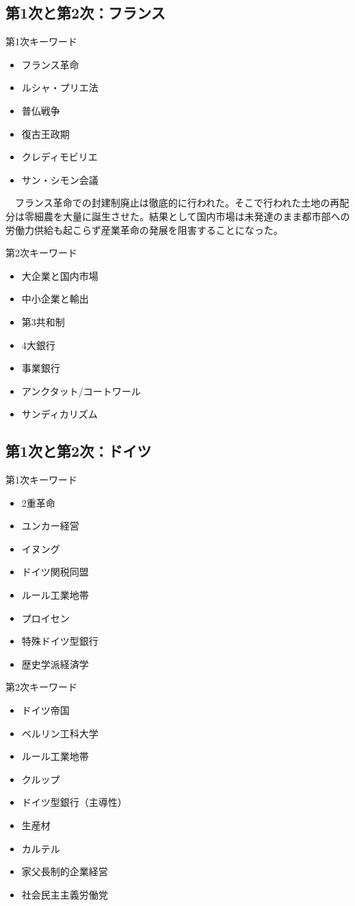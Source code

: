 \documentclass{jsarticle}
\begin{document}
\subsection{第1次と第2次：フランス}
第1次キーワード
\begin{itemize}
\item フランス革命
\item ルシャ・プリエ法
\item 普仏戦争
\item 復古王政期
\item クレディモビリエ
\item サン・シモン会議
\end{itemize}
　フランス革命での封建制廃止は徹底的に行われた。そこで行われた土地の再配分は零細農を大量に誕生させた。結果として国内市場は未発達のまま都市部への労働力供給も起こらず産業革命の発展を阻害することになった。

第2次キーワード
\begin{itemize}
\item 大企業と国内市場
\item 中小企業と輸出
\item 第3共和制
\item 4大銀行
\item 事業銀行
\item アンクタット/コートワール
\item サンディカリズム
\end{itemize}

\subsection{第1次と第2次：ドイツ}
第1次キーワード
\begin{itemize}
\item 2重革命
\item ユンカー経営
\item イヌング
\item ドイツ関税同盟
\item ルール工業地帯
\item プロイセン
\item 特殊ドイツ型銀行
\item 歴史学派経済学
\end{itemize}
第2次キーワード
\begin{itemize}
\item ドイツ帝国
\item ベルリン工科大学
\item ルール工業地帯
\item クルップ
\item ドイツ型銀行（主導性）
\item 生産材
\item カルテル
\item 家父長制的企業経営
\item 社会民主主義労働党
\end{itemize}
\end{document}

